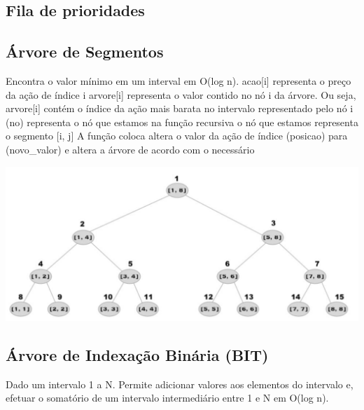 \documentclass[a4paper,12pt]{article}
\begin{document}
\subsection{Fila de prioridades}

\subsection{Árvore de Segmentos}
\indent Encontra o valor mínimo em um interval em O(log n).
acao[i] representa o preço da ação de índice i
arvore[i] representa o valor contido no nó i da árvore.
\newline Ou seja, arvore[i] contém o índice da ação mais barata
no intervalo representado pelo nó i
(no) representa o nó que estamos na função recursiva o nó que estamos representa o segmento [i, j]
\newline A função coloca altera o valor da ação de índice (posicao) para (novo\_valor) e altera a árvore de acordo com o necessário
\begin{center}
  \includegraphics[width=\linewidth]{figures/estruturas/arvore_de_segmentos.png}
\end{center}

\subsection{Árvore de Indexação Binária (BIT)}
\indent Dado um intervalo 1 a N. Permite adicionar valores aos elementos do intervalo e, efetuar o somatório de um intervalo intermediário entre 1 e N em O(log n).
\end{document}
